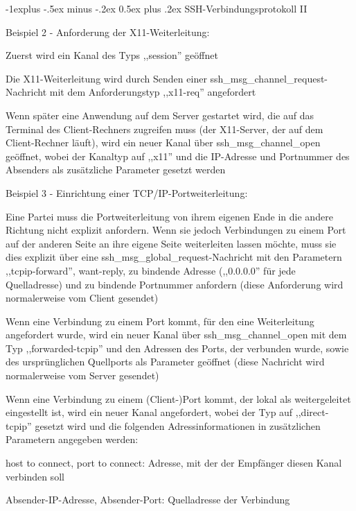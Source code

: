 \documentclass[a4paper]{article}
\makeatletter
\renewcommand{\subsection}{\@startsection{subsection}{2}{0mm}%
 {-1explus -.5ex minus -.2ex}%
 {0.5ex plus .2ex}%
 {\normalfont\normalsize\bfseries}}
\makeatother
\begin{document}
\begin{multicols}{3}
      \subsection{SSH-Verbindungsprotokoll II}
      \begin{itemize*}
            \item Beispiel 2 - Anforderung der X11-Weiterleitung:
            \begin{itemize*}
                  \item Zuerst wird ein Kanal des Typs ,,session'' geöffnet
                  \item Die X11-Weiterleitung wird durch Senden einer ssh\_msg\_channel\_request-Nachricht mit dem Anforderungstyp ,,x11-req'' angefordert
                  \item Wenn später eine Anwendung auf dem Server gestartet wird, die auf das Terminal des Client-Rechners zugreifen muss (der X11-Server, der auf dem Client-Rechner läuft), wird ein neuer Kanal über ssh\_msg\_channel\_open geöffnet, wobei der Kanaltyp auf ,,x11'' und die IP-Adresse und Portnummer des Absenders als zusätzliche Parameter gesetzt werden
            \end{itemize*}
            \item Beispiel 3 - Einrichtung einer TCP/IP-Portweiterleitung:
            \begin{itemize*}
                  \item Eine Partei muss die Portweiterleitung von ihrem eigenen Ende in die andere Richtung nicht explizit anfordern. Wenn sie jedoch Verbindungen zu einem Port auf der anderen Seite an ihre eigene Seite weiterleiten lassen möchte, muss sie dies explizit über eine ssh\_msg\_global\_request-Nachricht mit den Parametern ,,tcpip-forward'', want-reply, zu bindende Adresse (,,0.0.0.0'' für jede Quelladresse) und zu bindende Portnummer anfordern (diese Anforderung wird normalerweise vom Client gesendet)
                  \item Wenn eine Verbindung zu einem Port kommt, für den eine Weiterleitung angefordert wurde, wird ein neuer Kanal über ssh\_msg\_channel\_open mit dem Typ ,,forwarded-tcpip'' und den Adressen des Ports, der verbunden wurde, sowie des ursprünglichen Quellports als Parameter geöffnet (diese Nachricht wird normalerweise vom Server gesendet)
                  \item Wenn eine Verbindung zu einem (Client-)Port kommt, der lokal als weitergeleitet eingestellt ist, wird ein neuer Kanal angefordert, wobei der Typ auf ,,direct-tcpip'' gesetzt wird und die folgenden Adressinformationen in zusätzlichen Parametern angegeben werden:
                  \begin{itemize*}
                        \item host to connect, port to connect: Adresse, mit der der Empfänger diesen Kanal verbinden soll
                        \item Absender-IP-Adresse, Absender-Port: Quelladresse der Verbindung
                  \end{itemize*}
            \end{itemize*}
      \end{itemize*}


\end{multicols}
\end{document}
